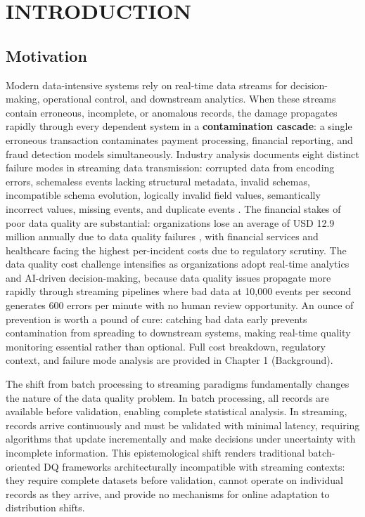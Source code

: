 \chapter{INTRODUCTION}

\section{Motivation}

Modern data-intensive systems rely on real-time data streams for decision-making, operational control, and downstream analytics. When these streams contain erroneous, incomplete, or anomalous records, the damage propagates rapidly through every dependent system in a \textbf{contamination cascade}: a single erroneous transaction contaminates payment processing, financial reporting, and fraud detection models simultaneously. Industry analysis documents eight distinct failure modes in streaming data transmission: corrupted data from encoding errors, schemaless events lacking structural metadata, invalid schemas, incompatible schema evolution, logically invalid field values, semantically incorrect values, missing events, and duplicate events \citep{confluent_2025}. The financial stakes of poor data quality are substantial: organizations lose an average of USD 12.9 million annually due to data quality failures \citep{ibm_dq2024}, with financial services and healthcare facing the highest per-incident costs due to regulatory scrutiny. The data quality cost challenge intensifies as organizations adopt real-time analytics and AI-driven decision-making, because data quality issues propagate more rapidly through streaming pipelines where bad data at 10,000 events per second generates 600 errors per minute with no human review opportunity. An ounce of prevention is worth a pound of cure: catching bad data early prevents contamination from spreading to downstream systems, making real-time quality monitoring essential rather than optional. Full cost breakdown, regulatory context, and failure mode analysis are provided in Chapter 1 (Background).

The shift from batch processing to streaming paradigms fundamentally changes the nature of the data quality problem. In batch processing, all records are available before validation, enabling complete statistical analysis. In streaming, records arrive continuously and must be validated with minimal latency, requiring algorithms that update incrementally and make decisions under uncertainty with incomplete information. This epistemological shift renders traditional batch-oriented DQ frameworks architecturally incompatible with streaming contexts: they require complete datasets before validation, cannot operate on individual records as they arrive, and provide no mechanisms for online adaptation to distribution shifts.


